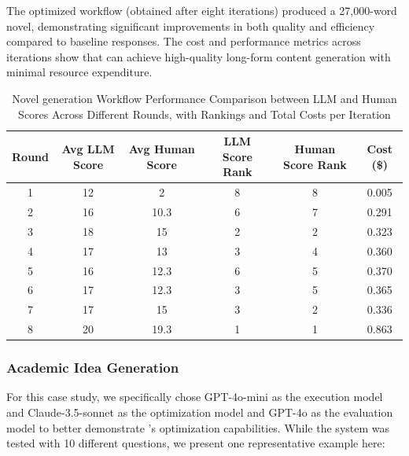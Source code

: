 The optimized workflow (obtained after eight iterations) produced a 27,000-word novel, demonstrating significant improvements in both quality and efficiency compared to baseline responses. The cost and performance metrics across iterations show that \model can achieve high-quality long-form content generation with minimal resource expenditure.

\begin{table}[h]
\renewcommand\arraystretch{1.2}
\setlength{\arrayrulewidth}{0.8pt}
\setlength{\tabcolsep}{4pt}
\setlength{\abovecaptionskip}{0.1cm}
\setlength{\belowcaptionskip}{-0.2cm}
\centering
\begin{tabular*}{\textwidth}{@{\extracolsep{\fill}}cccccc@{}}  
\hline
Round & Avg LLM Score & Avg Human Score & LLM Score Rank & Human Score Rank & Cost (\$) \\
\hline
1 & 12 & 2 & 8 & 8 & 0.005 \\
2 & 16 & 10.3 & 6 & 7 & 0.291 \\
3 & 18 & 15 & 2 & 2 & 0.323 \\
4 & 17 & 13 & 3 & 4 & 0.360 \\
5 & 16 & 12.3 & 6 & 5 & 0.370 \\
6 & 17 & 12.3 & 3 & 5 & 0.365 \\
7 & 17 & 15 & 3 & 2 & 0.336 \\
8 & 20 & 19.3 & 1 & 1 & 0.863 \\
\hline
\end{tabular*}
\caption{Novel generation Workflow Performance Comparison between LLM and Human Scores Across Different Rounds, with Rankings and Total Costs per Iteration}
\label{tab:novel-workflow-performance}
\end{table}



\subsubsection{Academic Idea Generation}
For this case study, we specifically chose GPT-4o-mini as the execution model and Claude-3.5-sonnet as the optimization model and GPT-4o as the evaluation model to better demonstrate \model's optimization capabilities. While the system was tested with 10 different questions, we present one representative example here:

\label{appendix:Idea data}


